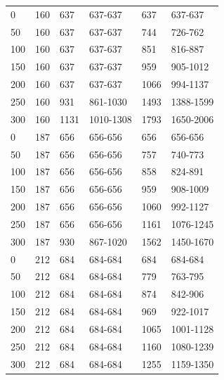 \begin{table}[H]
{\begin{tabular}{@{\extracolsep{2 pt}}llllll@{}}
			\hline
			0 & 160 & 637 & 637-637 & 637 & 637-637 \\ 
			50 & 160 & 637 & 637-637 & 744 & 726-762 \\ 
			100 & 160 & 637 & 637-637 & 851 & 816-887 \\ 
			150 & 160 & 637 & 637-637 & 959 & 905-1012 \\ 
			200 & 160 & 637 & 637-637 & 1066 & 994-1137 \\ 
			250 & 160 & 931 & 861-1030 & 1493 & 1388-1599 \\ 
			300 & 160 & 1131 & 1010-1308 & 1793 & 1650-2006 \\ 
			\hline
			0 & 187 & 656 & 656-656 & 656 & 656-656 \\ 
			50 & 187 & 656 & 656-656 & 757 & 740-773 \\ 
			100 & 187 & 656 & 656-656 & 858 & 824-891 \\ 
			150 & 187 & 656 & 656-656 & 959 & 908-1009 \\ 
			200 & 187 & 656 & 656-656 & 1060 & 992-1127 \\ 
			250 & 187 & 656 & 656-656 & 1161 & 1076-1245 \\ 
			300 & 187 & 930 & 867-1020 & 1562 & 1450-1670 \\ 
			\hline
			0 & 212 & 684 & 684-684 & 684 & 684-684 \\ 
			50 & 212 & 684 & 684-684 & 779 & 763-795 \\ 
			100 & 212 & 684 & 684-684 & 874 & 842-906 \\ 
			150 & 212 & 684 & 684-684 & 969 & 922-1017 \\ 
			200 & 212 & 684 & 684-684 & 1065 & 1001-1128 \\ 
			250 & 212 & 684 & 684-684 & 1160 & 1080-1239 \\ 
			300 & 212 & 684 & 684-684 & 1255 & 1159-1350 \\
			\hline
			
		\end{tabular}
	}
	\label{ap_b_p_sim}
\end{table}




\bgroup

\renewcommand{\arraystretch}{1.1}

